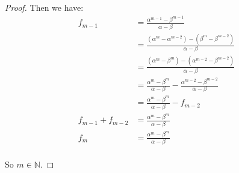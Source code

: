 \documentclass[12pt,letterpaper]{article}
\begin{document}
\begin{enumerate}
\begin{enumerate}
\begin{enumerate}
\begin{proof}
                Then we have:
                \begin{align*}
                  f_{m - 1} &= \frac{\alpha^{m - 1} - \beta^{m - 1}}{\alpha - \beta} \\
                  &= \frac{\left(\alpha^m - \alpha^{m - 2}\right) - \left(\beta^m - \beta^{m - 2}\right)}{\alpha - \beta} \\
                  &= \frac{\left(\alpha^m - \beta^m\right) - \left(\alpha^{m - 2} - \beta^{m - 2}\right)}{\alpha - \beta} \\
                  &= \frac{\alpha^m - \beta^m}{\alpha - \beta} - \frac{\alpha^{m - 2} - \beta^{m - 2}}{\alpha - \beta} \\
                  &= \frac{\alpha^m - \beta^m}{\alpha - \beta} - f_{m - 2} \\
                  f_{m - 1} + f_{m - 2} &= \frac{\alpha^m - \beta^m}{\alpha - \beta} \\
                  f_m &= \frac{\alpha^m - \beta^m}{\alpha - \beta} \\
                \end{align*}

                So $m \in \mathbb{N}$.


\end{proof}
\end{enumerate}
\end{enumerate}
\end{enumerate}
\end{document}
